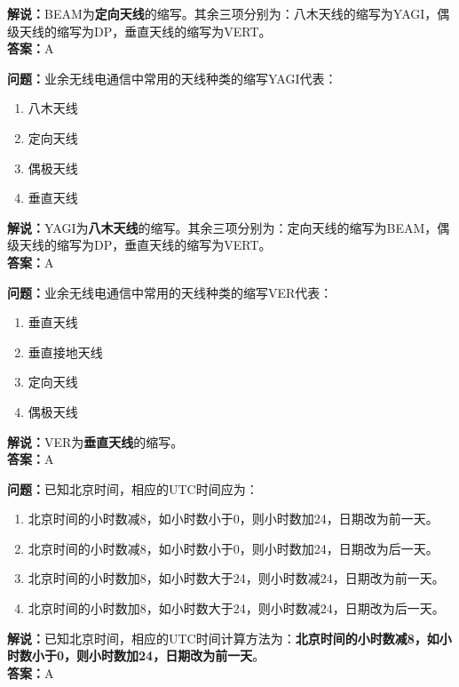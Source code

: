 \textbf{解说：}BEAM为\textbf{定向天线}的缩写。其余三项分别为：八木天线的缩写为YAGI，偶级天线的缩写为DP，垂直天线的缩写为VERT。\\\textbf{答案：}A



\textbf{问题：}业余无线电通信中常用的天线种类的缩写YAGI代表：

\begin{enumerate}[label=\Alph*), leftmargin=1cm]
	\item 八木天线
	\item 定向天线
	\item 偶极天线
	\item 垂直天线
\end{enumerate}

\textbf{解说：}YAGI为\textbf{八木天线}的缩写。其余三项分别为：定向天线的缩写为BEAM，偶级天线的缩写为DP，垂直天线的缩写为VERT。\\\textbf{答案：}A



\textbf{问题：}业余无线电通信中常用的天线种类的缩写VER代表：

\begin{enumerate}[label=\Alph*), leftmargin=1cm]
	\item 垂直天线
	\item 垂直接地天线
	\item 定向天线
	\item 偶极天线
\end{enumerate}

\textbf{解说：}VER为\textbf{垂直天线}的缩写。\\\textbf{答案：}A



\textbf{问题：}已知北京时间，相应的UTC时间应为：

\begin{enumerate}[label=\Alph*), leftmargin=1cm]
	\item 北京时间的小时数减8，如小时数小于0，则小时数加24，日期改为前一天。
	\item 北京时间的小时数减8，如小时数小于0，则小时数加24，日期改为后一天。
	\item 北京时间的小时数加8，如小时数大于24，则小时数减24，日期改为前一天。
	\item 北京时间的小时数加8，如小时数大于24，则小时数减24，日期改为后一天。
\end{enumerate}

\textbf{解说：}已知北京时间，相应的UTC时间计算方法为：\textbf{北京时间的小时数减8，如小时数小于0，则小时数加24，日期改为前一天}。\\\textbf{答案：}A



